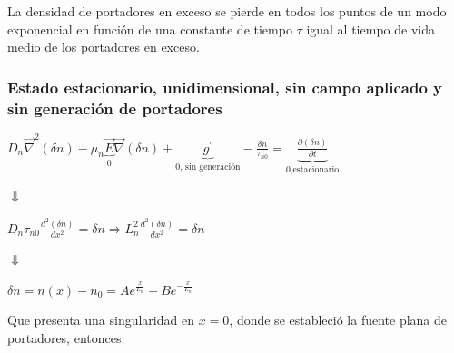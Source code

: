 \documentclass[oneside]{book}
\numberwithin{equation}{section}
\numberwithin{figure}{section}
\numberwithin{table}{section}
\begin{document}
					La densidad de portadores en exceso se pierde en todos los puntos de un modo exponencial en función de una constante de tiempo $\tau$ igual al tiempo de vida medio de los portadores en exceso.\\
	
				\subsubsection{Estado estacionario, unidimensional, sin campo aplicado y sin generación de portadores}
	
					\begin{center}
						$\displaystyle D_n\vec{\nabla}^2(\delta n)-\mu_n\underbrace{\vec{E}}_{\text{0}}\vec{\nabla} (\delta n)+\underbrace{g^\prime}_{\text{0, sin generación}} -\frac{\delta n}{\tau_{n0}}=\underbrace{\frac{\partial (\delta n)}{\partial t}}_{\text{0,estacionario}}$
					\end{center}
					\begin{center}
						$\Downarrow$
					\end{center}
					\begin{center}
						$\displaystyle D_n \tau_{n0}\frac{d^2 (\delta n)}{d x^2}=\delta n \Rightarrow L_n^2\frac{d^2 (\delta n)}{d x^2}=\delta n$
					\end{center}
					\begin{center}
						$\Downarrow$
					\end{center}
					\begin{center}
						$\displaystyle \delta n=n(x)-n_0=A e^{\frac{x}{L_n}}+B e^{-\frac{x}{L_n}}$
					\end{center}
	
					Que presenta una singularidad en $x=0$, donde se estableció la fuente plana de portadores, entonces:\\
					
\end{document}
